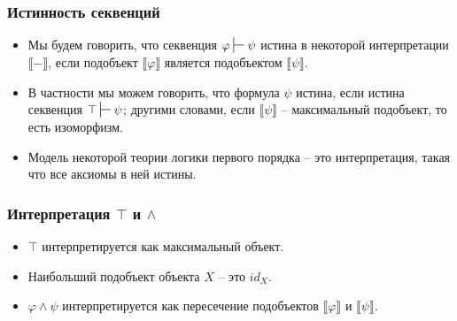 \documentclass{beamer}
\theoremstyle{definition}
\renewcommand{\ll}{\llbracket}
\newcommand{\rr}{\rrbracket}
\begin{document}
\begin{frame}
\frametitle{Истинность секвенций}
\begin{itemize}
\item Мы будем говорить, что секвенция $\varphi \sststile{}{} \psi$ истина в некоторой интерпретации $\ll - \rr$, если подобъект $\ll \varphi \rr$ является подобъектом $\ll \psi \rr$.
\item В частности мы можем говорить, что формула $\psi$ истина, если истина секвенция $\top \sststile{}{} \psi$; другими словами, если $\ll \psi \rr$ -- максимальный подобъект, то есть изоморфизм.
\item Модель некоторой теории логики первого порядка -- это интерпретация, такая что все аксиомы в ней истины.
\end{itemize}
\end{frame}

\begin{frame}
\frametitle{Интерпретация $\top$ и $\land$}
\begin{itemize}
\item $\top$ интерпретируется как максимальный объект.
\item Наибольший подобъект объекта $X$ -- это $id_X$.
\item $\varphi \land \psi$ интерпретируется как пересечение подобъектов $\ll \varphi \rr$ и $\ll \psi \rr$.
\end{itemize}
\end{frame}
\end{document}
